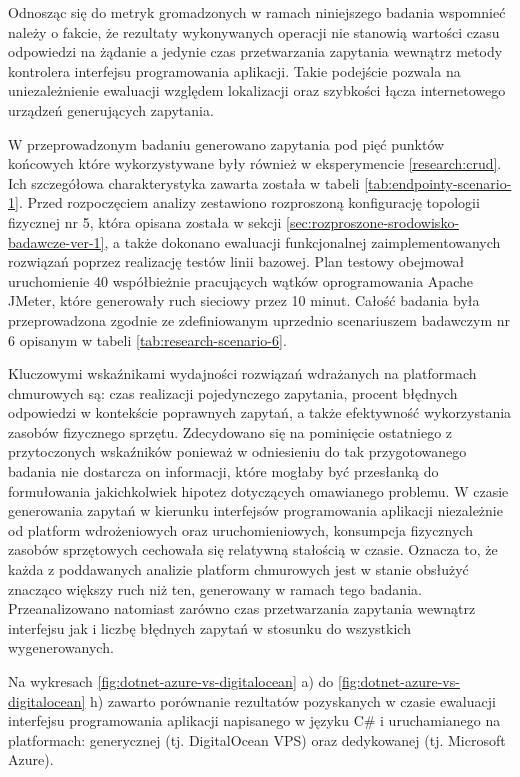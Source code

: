 Odnosząc się do metryk gromadzonych w ramach niniejszego badania wspomnieć należy o fakcie, że rezultaty wykonywanych operacji nie stanowią wartości czasu odpowiedzi na żądanie a jedynie czas przetwarzania zapytania wewnątrz metody kontrolera interfejsu programowania aplikacji. Takie podejście pozwala na uniezależnienie ewaluacji względem lokalizacji oraz szybkości łącza internetowego urządzeń generujących zapytania.

W przeprowadzonym badaniu generowano zapytania pod pięć punktów końcowych które wykorzystywane były również w eksperymencie \ref{research:crud}. Ich szczegółowa charakterystyka zawarta została w tabeli \ref{tab:endpointy-scenario-1}. Przed rozpoczęciem analizy zestawiono rozproszoną konfigurację topologii fizycznej nr 5, która opisana została w sekcji \ref{sec:rozproszone-srodowisko-badawcze-ver-1}, a także dokonano ewaluacji funkcjonalnej zaimplementowanych rozwiązań poprzez realizację testów linii bazowej. Plan testowy obejmował uruchomienie 40 współbieżnie pracujących wątków oprogramowania Apache JMeter, które generowały ruch sieciowy przez 10 minut. Całość badania była przeprowadzona zgodnie ze zdefiniowanym uprzednio scenariuszem badawczym nr 6 opisanym w tabeli \ref{tab:research-scenario-6}.

Kluczowymi wskaźnikami wydajności rozwiązań wdrażanych na platformach chmurowych są: czas realizacji pojedynczego zapytania, procent błędnych odpowiedzi w kontekście poprawnych zapytań, a także efektywność wykorzystania zasobów fizycznego sprzętu. Zdecydowano się na pominięcie ostatniego z przytoczonych wskaźników ponieważ w odniesieniu do tak przygotowanego badania nie dostarcza on informacji, które mogłaby być przesłanką do formułowania jakichkolwiek hipotez dotyczących omawianego problemu. W czasie generowania zapytań w kierunku interfejsów programowania aplikacji niezależnie od platform wdrożeniowych oraz uruchomieniowych, konsumpcja fizycznych zasobów sprzętowych cechowała się relatywną stałością w czasie. Oznacza to, że każda z poddawanych analizie platform chmurowych jest w stanie obsłużyć znacząco większy ruch niż ten, generowany w ramach tego badania. Przeanalizowano natomiast zarówno czas przetwarzania zapytania wewnątrz interfejsu jak i liczbę błędnych zapytań w stosunku do wszystkich wygenerowanych.     

Na wykresach \ref{fig:dotnet-azure-vs-digitalocean} a) do \ref{fig:dotnet-azure-vs-digitalocean} h) zawarto porównanie rezultatów pozyskanych w czasie ewaluacji interfejsu programowania aplikacji napisanego w języku C\# i uruchamianego na platformach: generycznej (tj. DigitalOcean VPS) oraz dedykowanej (tj. Microsoft Azure).

